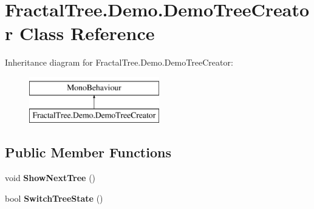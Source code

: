 \hypertarget{class_fractal_tree_1_1_demo_1_1_demo_tree_creator}{}\section{Fractal\+Tree.\+Demo.\+Demo\+Tree\+Creator Class Reference}
\label{class_fractal_tree_1_1_demo_1_1_demo_tree_creator}
Inheritance diagram for Fractal\+Tree.\+Demo.\+Demo\+Tree\+Creator\+:\begin{figure}[H]
\begin{center}
\leavevmode
\includegraphics[height=2.000000cm]{class_fractal_tree_1_1_demo_1_1_demo_tree_creator}
\end{center}
\end{figure}
\subsection*{Public Member Functions}
\begin{DoxyCompactItemize}
\item 
\mbox{\label{class_fractal_tree_1_1_demo_1_1_demo_tree_creator_a6bacdd305fc4484980730e71d22d8c37}} 
void {\bfseries Show\+Next\+Tree} ()
\item 
\mbox{\label{class_fractal_tree_1_1_demo_1_1_demo_tree_creator_a82a2a0699f5bb6e0af8228d98672cf5f}} 
bool {\bfseries Switch\+Tree\+State} ()
\end{DoxyCompactItemize}
